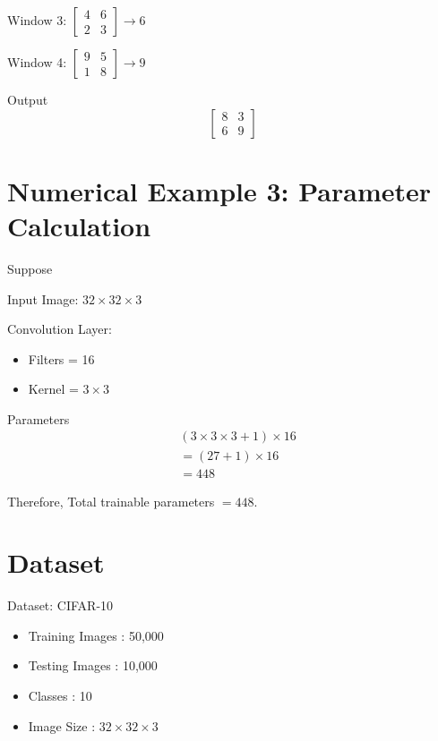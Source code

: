 \documentclass[11pt]{article}
\begin{document}
Window 3: $\begin{bmatrix} 4 & 6 \\ 2 & 3 \end{bmatrix} \rightarrow 6$

Window 4: $\begin{bmatrix} 9 & 5 \\ 1 & 8 \end{bmatrix} \rightarrow 9$

Output
\[
\begin{bmatrix}
8 & 3 \\
6 & 9
\end{bmatrix}
\]

\section{Numerical Example 3: Parameter Calculation}

Suppose

Input Image: $32 \times 32 \times 3$

Convolution Layer:
\begin{itemize}
    \item Filters = 16
    \item Kernel = $3 \times 3$
\end{itemize}

Parameters
\begin{align*}
&(3 \times 3 \times 3 + 1) \times 16 \\
&= (27 + 1) \times 16 \\
&= 448
\end{align*}

Therefore, Total trainable parameters $= 448$.

\section{Dataset}

Dataset: CIFAR-10
\begin{itemize}
    \item Training Images : 50{,}000
    \item Testing Images : 10{,}000
    \item Classes : 10
    \item Image Size : $32 \times 32 \times 3$
\end{itemize}

\end{document}
